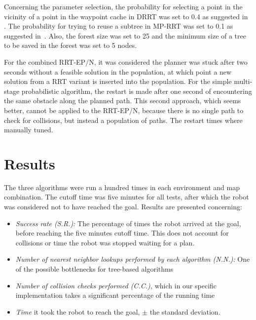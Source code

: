 Concerning the parameter selection, the probability for selecting a point in the
vicinity of a point in the waypoint cache in DRRT was set to 0.4 as suggested in~%
\cite{Ferguson06}. The probability for trying to reuse a subtree in
MP-RRT was set to 0.1 as suggested in~\cite{Zucker07}.
Also, the forest size was set to 25 and the minimum size of a
tree to be saved in the forest was set to 5 nodes.

For the combined RRT-EP/N, it was considered the planner was stuck after two
seconds without a feasible solution in the population, at which point a
new solution from a RRT variant is inserted into the population. For the simple
multi-stage probabilistic algorithm, the restart is made after one second of
encountering the same obstacle along the planned path. This second approach,
which seems better, cannot be applied to the RRT-EP/N, because there is no
single path to check for collisions, but instead a population of paths. The
restart times where manually tuned.

\section{Results}
\label{sec:results}
The three algorithms were run a hundred times in each
environment and map combination.
The cutoff time was five minutes for all tests, after which the robot was
considered not to have reached the goal. Results are presented concerning:
\begin{itemize}
\item {\it Success rate (S.R.):} The percentage of times the robot arrived at the goal,
before reaching the five minutes cutoff time. This does not account for
collisions or time the robot was stopped waiting for a plan.
\item {\it Number of nearest neighbor lookups performed by each algorithm (N.N.):} One of the
possible bottlenecks for tree-based algorithms
\item {\it Number of collision checks performed (C.C.),} which in our specific
implementation takes a significant percentage of
the running time
\item {\it Time} it took the robot to reach the goal, $\pm$ the standard
deviation.
\end{itemize}

